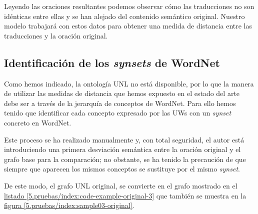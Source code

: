 \documentclass[a4paper,12pt,spanish]{book}
\begin{document}
Leyendo las oraciones resultantes podemos observar cómo las traducciones no son idénticas
entre ellas y se han alejado del contenido semántico original. Nuestro modelo trabajará con
estos datos para obtener una medida de distancia entre las traducciones y la oración
original.


\subsection{Identificación de los \emph{synsets} de WordNet}
\label{5.pruebas/index:identificacion-de-los-synsets-de-wordnet}
Como hemos indicado, la ontología UNL no está disponible, por lo que la manera
de utilizar las medidas de distancia que hemos expuesto en el estado del arte debe
ser a través de la jerarquía de conceptos de WordNet. Para ello hemos tenido que
identificar cada concepto expresado por las UWs con un \emph{synset} concreto en WordNet.

Este proceso se ha realizado manualmente y, con total seguridad, el autor está
introduciendo una primera
desviación semántica entre la oración original y el grafo base para la comparación; no
obstante, se ha tenido la precaución de que siempre que aparecen los mismos conceptos
se sustituye por el mismo \emph{synset}.

De este modo, el grafo UNL original, se convierte en el grafo mostrado en el
\hyperref[5.pruebas/index:code-example-original-3]{listado  \ref*{5.pruebas/index:code-example-original-3}} que también se muestra en la
\hyperref[5.pruebas/index:sample03-original]{figura  \ref*{5.pruebas/index:sample03-original}}.
\end{document}
